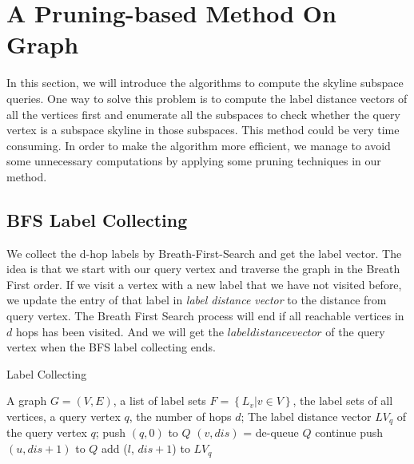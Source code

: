 
%
%

\chapter{A Pruning-based Method On Graph}
\label{ch:graph}

In this section, we will introduce the algorithms to compute the skyline subspace queries. One way to solve this problem is to compute the label distance vectors of all the vertices first and enumerate all the subspaces to check whether the query vertex is a subspace skyline in those subspaces. This method could be very time consuming. In order to make the algorithm more efficient, we manage to avoid some unnecessary computations by applying some pruning techniques in our method. 

\section{BFS Label Collecting}
\label{sec:bfs-collect}
We collect the d-hop labels by Breath-First-Search and get the label vector. The idea is that we start with our query vertex and traverse the graph in the Breath First order. If we visit a vertex with a new label that we have not visited before, we update the entry of that label in \emph{label distance vector} to the distance from query vertex. The Breath First Search process will end if all reachable vertices in $d$ hops has been visited. And we will get the $label distance vector$ of the query vertex when the BFS label collecting ends.

\begin{algorithm}[H]
  \caption{Label Collecting}\label{algo:blah}
  \begin{algorithmic}[1]
  \show\LOOP
    \REQUIRE A graph $G=(V,E)$, a list of label sets $F=\left\{L_v | v \in V\right\}$, the label sets of all vertices, a query vertex $q$, the number of hops $d$;
    \ENSURE The label distance vector $LV_q$ of the query vertex $q$;
    \STATE push $\left(q, 0\right)$ to $Q$
        \STATE $\left( v, dis\right)$ = de-queue $Q$
            \STATE continue
        \ENDIF
            \STATE push $\left(u, dis+1\right)$ to $Q$
                    \STATE add ($l$, $dis+1$) to $LV_q$
                \ENDIF
            \ENDFOR
        \ENDFOR
    \ENDWHILE
  \end{algorithmic}
\end{algorithm}

